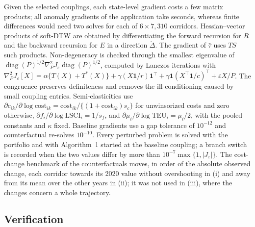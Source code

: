 \documentclass[12pt]{article}
\begin{document}
Given the selected couplings, each state-level gradient costs a few matrix products; all anomaly gradients of the application take seconds, whereas finite differences would need two solves for each of $6\times7{,}310$ corridors. Hessian--vector products of soft-DTW are obtained by differentiating the forward recursion for $R$ and the backward recursion for $E$ in a direction $\dot\Delta$. The gradient of $\hat\tau$ uses $TS$ such products. Non-degeneracy is checked through the smallest eigenvalue of $\operatorname{diag}(P)^{1/2}\nabla^2_PJ_\varepsilon\operatorname{diag}(P)^{1/2}$, computed by Lanczos iterations with $\nabla_P^2J_\varepsilon[X]=\alpha\{T(X)+T^\ast(X)\}+\gamma(X\mathbf 1/r)\mathbf 1^\top+\gamma\mathbf 1(X^\top\mathbf 1/c)^\top+\varepsilon X/P$. The congruence preserves definiteness and removes the ill-conditioning caused by small coupling entries. Semi-elasticities use $\partial c_{ik}/\partial\log\mathrm{cost}_{ik}=\mathrm{cost}_{ik}/\{(1+\mathrm{cost}_{ik})s_c\}$ for unwinsorized costs and zero otherwise, $\partial f_i/\partial\log\mathrm{LSCI}_i=1/s_f$, and $\partial\mu_i/\partial\log\mathrm{TEU}_i=\mu_i/2$, with the pooled constants and $\kappa$ fixed. Baseline gradients use a gap tolerance of $10^{-12}$ and counterfactual re-solves $10^{-10}$. Every perturbed problem is solved with the portfolio and with Algorithm~1 started at the baseline coupling; a branch switch is recorded when the two values differ by more than $10^{-7}\max\{1,|J_\varepsilon|\}$. The cost-change benchmark of the counterfactuals moves, in order of the absolute observed change, each corridor towards its 2020 value without overshooting in (i) and away from its mean over the other years in (ii); it was not used in (iii), where the changes concern a whole trajectory.

\subsection{Verification}\label{sec:sensverif}
\end{document}
